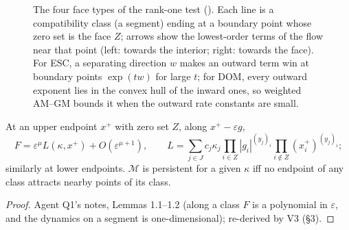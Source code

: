 \documentclass[11pt,a4paper]{report}
\begin{document}
\begin{figure}[ht]
\centering
{}
\caption{The four face types of the rank-one test (). Each line is a compatibility class (a segment)
ending at a boundary point whose zero set is the face \(Z\); arrows show the lowest-order terms of the flow near that
point (left: towards the interior; right: towards the face). For ESC, a separating direction \(w\) makes an outward
term win at boundary points \(\exp(tw)\) for large \(t\); for DOM, every outward exponent lies in the convex hull of the
inward ones, so weighted AM--GM bounds it when the outward rate constants are small.}\label{fig:faces}
\end{figure}

\begin{lemma}\label{lem:endpoint}
At an upper endpoint \(x^+\) with zero set \(Z\), along \(x^+-\varepsilon g\),
\[F=\varepsilon^\mu L(\kappa,x^+)+O(\varepsilon^{\mu+1}),\qquad L=\sum_{j\in J}c_j\kappa_j\prod_{i\in Z}|g_i|^{(y_j)_i}
\prod_{i\notin Z}(x^+_i)^{(y_j)_i};\]
similarly at lower endpoints. \(\mathcal M\) is persistent for a given \(\kappa\) iff no
endpoint of any class attracts nearby points of its class.
\end{lemma}
\begin{proof}
Agent Q1's notes, Lemmas 1.1--1.2 (along a class \(F\) is a polynomial in \(\varepsilon\), and the dynamics on a segment
is one-dimensional); re-derived by V3 (§3).
\end{proof}
\end{document}
